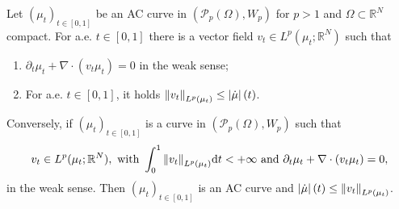 \begin{theorem}
	\label{theorem.relation_geodesics_CE}
	Let $\left(\mu_t\right)_{t \in [0,1]}$ be an AC curve in $\left(\mathcal{P}_p(\Omega), W_p\right)$ for $p>1$ and $\Omega \subset \mathbb{R}^N$ compact. For a.e. $t \in [0,1]$ there is a vector field $v_t \in L^p(\mu_t; \mathbb{R}^N)$ such that
	\begin{enumerate}
		\item $\partial_t \mu_{t} + \nabla \cdot(v_t \mu_{t}) = 0$ in the weak sense;
		\item For a.e. $t \in [0,1]$, it holds $\norm{v_t}_{L^p(\mu_{t})} \le \left|\dot{\mu}\right|(t)$.
	\end{enumerate} 

	Conversely, if $\left(\mu_t\right)_{t \in [0,1]}$ is a curve in $\left(\mathcal{P}_p(\Omega), W_p\right)$ such that 
	$$
	v_t \in L^p(\mu_{t}; \mathbb{R}^N), \text{ with } \int_0^1\norm{v_t}_{L^p(\mu_{t})}{\rm d} t < +\infty \text{ and } \partial_t\mu_{t} + \nabla\cdot(v_t\mu_t) = 0,
	$$
	in the weak sense. Then $\left(\mu_t\right)_{t \in [0,1]}$ is an AC curve and $\left|\dot{\mu}\right|(t) \le \norm{v_t}_{L^p(\mu_t)}$. 
\end{theorem}
